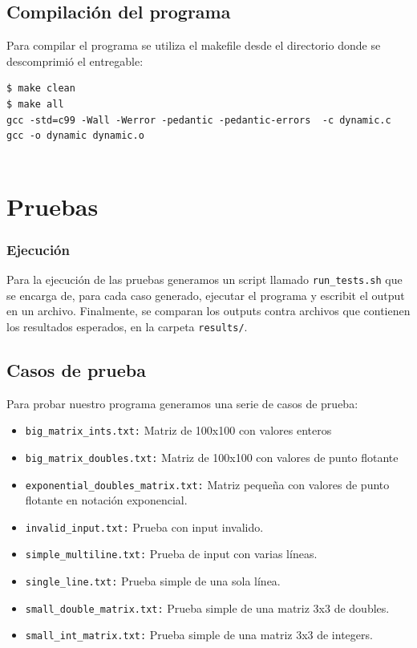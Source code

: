 \documentclass[a4paper,10pt, spanish]{article}
\begin{document}


\lstset{
  language=bash,
  basicstyle=\small\ttfamily
}

\subsection{Compilación del programa}
Para compilar el programa se utiliza el makefile desde el directorio donde se descomprimió el entregable:
\begin{lstlisting}
$ make clean
$ make all
gcc -std=c99 -Wall -Werror -pedantic -pedantic-errors  -c dynamic.c
gcc -o dynamic dynamic.o
	
\end{lstlisting}

\section{Pruebas}

\subsubsection{Ejecución}

Para la ejecución de las pruebas generamos un script llamado \lstinline{run_tests.sh} que se encarga de, para cada caso generado, ejecutar el programa y escribit el output en un archivo.
Finalmente, se comparan los outputs contra archivos que contienen los resultados esperados, en la carpeta \lstinline{results/}.

\subsection{Casos de prueba}

Para probar nuestro programa generamos una serie de casos de prueba:

\begin{itemize}
  \item \lstinline{big_matrix_ints.txt:} Matriz de 100x100 con valores enteros
	\item \lstinline{big_matrix_doubles.txt:} Matriz de 100x100 con valores de punto flotante
  \item \lstinline{exponential_doubles_matrix.txt:} Matriz pequeña con valores de punto flotante en notación exponencial. 
  \item \lstinline{invalid_input.txt:} Prueba con input invalido. 
  \item \lstinline{simple_multiline.txt:} Prueba de input con varias líneas. 
  \item \lstinline{single_line.txt:} Prueba simple de una sola línea. 
  \item \lstinline{small_double_matrix.txt:} Prueba simple de una matriz 3x3 de doubles. 
  \item \lstinline{small_int_matrix.txt:} Prueba simple de una matriz 3x3 de integers. 
\end{itemize}
\end{document}

